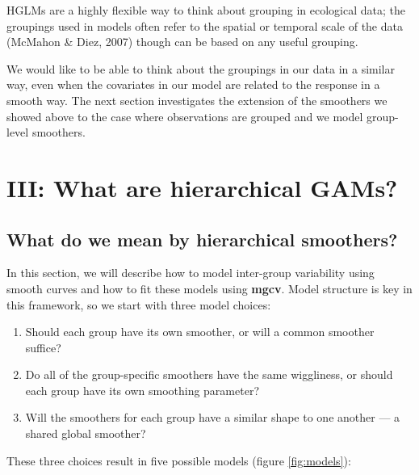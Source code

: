 \documentclass[12pt]{article}
\providecommand{\tightlist}{%
  \setlength{\itemsep}{0pt}\setlength{\parskip}{0pt}}
\begin{document}
HGLMs are a highly flexible way to think about grouping in ecological
data; the groupings used in models often refer to the spatial or
temporal scale of the data (McMahon \& Diez, 2007) though can be based
on any useful grouping.

We would like to be able to think about the groupings in our data in a
similar way, even when the covariates in our model are related to the
response in a smooth way. The next section investigates the extension of
the smoothers we showed above to the case where observations are grouped
and we model group-level smoothers. \FloatBarrier

\section{III: What are hierarchical
GAMs?}\label{iii-what-are-hierarchical-gams}

\subsection{What do we mean by hierarchical
smoothers?}\label{what-do-we-mean-by-hierarchical-smoothers}

In this section, we will describe how to model inter-group variability
using smooth curves and how to fit these models using \textbf{mgcv}.
Model structure is key in this framework, so we start with three model
choices:

\begin{enumerate}
\def\labelenumi{\arabic{enumi}.}
\tightlist
\item
  Should each group have its own smoother, or will a common smoother
  suffice?
\item
  Do all of the group-specific smoothers have the same wiggliness, or
  should each group have its own smoothing parameter?
\item
  Will the smoothers for each group have a similar shape to one another
  --- a shared global smoother?
\end{enumerate}

These three choices result in five possible models (figure
\ref{fig:models}):
\end{document}
